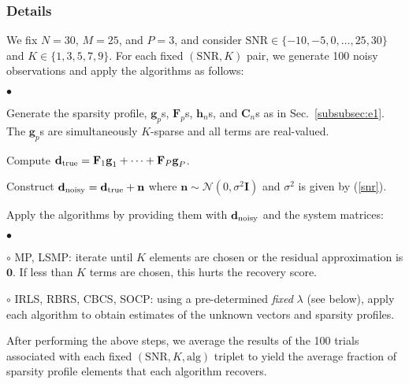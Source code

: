\documentclass[final]{siamltex}
\newenvironment{adamItemize2}{\begin{list}{$\bullet$}
{\setlength{\rightmargin}{0em}
\setlength{\leftmargin}{1.0em}
\setlength{\itemsep}{4pt}
\setlength{\topsep}{2pt}
\setlength{\parsep}{0pt}}}{\end{list}}
\newcommand{\la}[1]{\mbox{$\mathbf{#1}$}}  \newcommand{\sst}[1]{\mbox{\scriptsize{#1}}}
\begin{document}
   \subsubsection{Details}\label{subsubsec:e2}
    We fix $N = 30$, $M = 25$, and $P = 3$, and consider $\mbox{SNR}
   \in \{-10, -5, 0, \ldots, 25, 30\}$ and $K \in \{1, 3, 5, 7, 9\}$.
   For each fixed $(\mbox{SNR}, K)$ pair, we generate 100 noisy
   observations and apply the algorithms as follows:
   \begin{adamItemize2}

     \item Generate the sparsity profile, $\la{g}_p$s, $\la{F}_p$s,
     $\la{h}_n$s, and $\la{C}_n$s as in Sec.~\ref{subsubsec:e1}.  The
     $\la{g}_p$s are simultaneously $K$-sparse and all terms are
     real-valued.

     \item Compute $\la{d}_{\sst{true}} = \la{F}_1 \la{g}_1 + \cdots +
     \la{F}_P \la{g}_P$.

     \item Construct $\la{d}_{\sst{noisy}} = \la{d}_{\sst{true}} +
     \la{n}$ where $\la{n} \sim \mathcal{N}(0, \sigma^2 \la{I})$ and
     $\sigma^2$ is given by (\ref{snr}).

     \item Apply the algorithms by providing them with
     $\la{d}_{\sst{noisy}}$ and the system matrices:

        \begin{adamItemize2}

        \item[$\circ$] MP, LSMP: iterate until $K$ elements are
        chosen or the residual approximation is $\la{0}$.  If less
        than $K$ terms are chosen, this hurts the recovery score.

        \item[$\circ$] IRLS, RBRS, CBCS, SOCP: using a pre-determined
        {\em{fixed}} $\lambda$ (see below), apply each algorithm to
        obtain estimates of the unknown vectors and sparsity profiles.

        \end{adamItemize2}

   \end{adamItemize2} After performing the above steps, we average the
   results of the 100 trials associated with each fixed $(\mbox{SNR},
   K,\mbox{alg})$ triplet to yield the average fraction of sparsity
   profile elements that each algorithm recovers.
\end{document}
